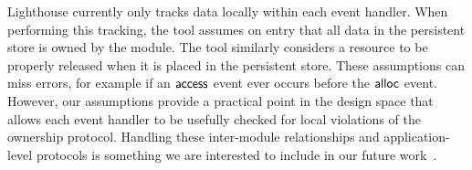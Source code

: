 Lighthouse currently only tracks data locally within each event handler.
When performing this tracking, the tool assumes on entry that all data
in the persistent store is owned by the module.  The tool similarly
considers a resource to be properly released when it is placed in the
persistent store.  These assumptions can miss errors, for example if
an ${\mathsf{access}}$ event ever occurs before the ${\mathsf{alloc}}$ event.  However,
our assumptions provide a practical point in the design space that
allows each event handler to be usefully checked for local violations
of the ownership protocol.
%
Handling these inter-module relationships and application-level
protocols is something we are interested to include in our future
work~\cite{AlurPOPL05,HJM05}.
%


